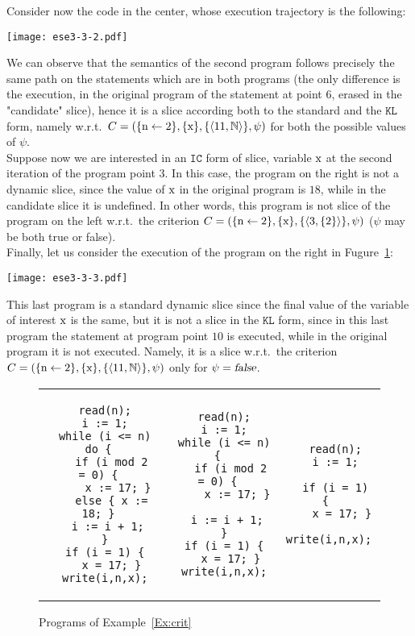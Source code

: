 \documentclass[prodmode,acmtocl]{acmsmall}
\def\crit{\ensuremath{C}\xspace}
\def\KL{\ensuremath{\mathtt{KL}}\xspace}
\def\IC{\ensuremath{\mathtt{IC}}\xspace}
\newcommand{\la}{\leftarrow}
\newcommand{\false}{\mbox{\sl false}}
\def\tuple#1{\langle #1 \rangle}
\newcommand{\0}{\mbox{\bf 0}}
\newcommand{\CODE}[1]{\ensuremath{\mbox{\lstinline!#1!}\xspace}\xspace}
\def\xx{\CODE{x}}
\def\nn{\CODE{n}}
\def\NATURALS{\mathbb{N}}
\begin{document}
\begin{example}
\noindent  
  Consider now the code in the center, whose execution trajectory is the following:
\begin{center}
\texttt{[image: ese3-3-2.pdf]}
\end{center}
  We can observe that the semantics of the second program follows
  precisely the same path on the statements which are in both programs
  (the only difference is the execution, in the original program of the statement at point $6$, erased in the "candidate" slice), hence it is a slice according both to the standard and the $\KL$
  form, namely w.r.t.\ $\crit=(\{\mbox{\nn}\la 2\},\{\xx\},\{\tuple{11,\NATURALS}\},\psi)$ for both the possible values of $\psi$.  \\
Suppose now we are interested in an $\IC$ form of slice, variable \xx at the second iteration of the  program point $3$. In this case, the program on the right is not a dynamic slice, since the value of
  \xx in the original program is $18$, while in the candidate slice it is
  undefined. In other words, this program is not slice of the program on the left w.r.t.\ the criterion $\crit=(\{\mbox{\nn}\la 2\},\{\xx\},\{\tuple{3,\{2\}}\},\psi)$ ($\psi$ may be both true or false). \\ 
  Finally, let us consider the execution of the program on the right in Fugure~\ref{Exfig:crit}:
  \begin{center}
\texttt{[image: ese3-3-3.pdf]}
\end{center}
 This last program is a standard dynamic slice since the
  final value of the variable of interest \xx is the same, but it is
  not a slice in the $\KL$ form, since in this last program the statement at program point $10$ is executed, while in the original program it is not executed. Namely, it is a slice w.r.t.\ the criterion $\crit=(\{\mbox{\nn}\la 2\},\{\xx\},\{\tuple{11,\NATURALS}\},\psi)$ only for $\psi=\false$.  
  \begin{figure}
    \begin{tabular}{c|c|c}
      \begin{lstlisting}
  read(n);
  i := 1;
  while (i <= n) do {
    if (i mod 2 = 0) {
      x := 17; }
    else { x := 18; }
    i := i + 1;       
  }
  if (i = 1) {
    x = 17; }
  write(i,n,x);
      \end{lstlisting}
      &
      \begin{lstlisting}
  read(n);
  i := 1;
  while (i <= n) {
    if (i mod 2 = 0) {
      x := 17; }
    
    i := i + 1;       
  }
  if (i = 1) {
    x = 17; }
  write(i,n,x);
      \end{lstlisting}
      &
      \begin{lstlisting}
  read(n);
  i := 1;
    
  if (i = 1) { 
    x = 17; }
  write(i,n,x);
      \end{lstlisting}
    \end{tabular}
    \caption{Programs of Example~\ref{Ex:crit}}\label{Exfig:crit}
  \end{figure}
\end{example}
\end{document}
